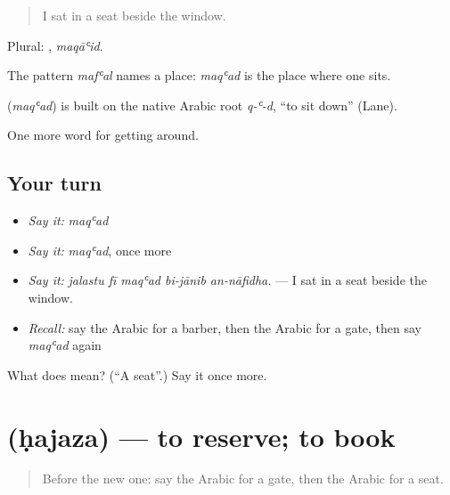 \begin{quote}
I sat in a seat beside the window.
\end{quote}

Plural: , \emph{maqāʿid}.

The pattern \emph{mafʿal} names a place: \emph{maqʿad} is the place where one sits.

\begin{cousinweb}
\textbf{} (\emph{maqʿad}) is built on the native Arabic root \emph{q-ʿ-d}, \textquotedblleft{}to sit down\textquotedblright{} (Lane).
\end{cousinweb}

\begin{grammarlens}[title={What you've built}]
One more word for getting around.
\end{grammarlens}

\subsection*{Your turn}
\begin{itemize}
\raggedright
  \item \emph{Say it:} \emph{maqʿad}
  \item \emph{Say it:} \emph{maqʿad}, once more
  \item \emph{Say it:} \emph{jalastu fī maqʿad bi-jānib an-nāfidha.} — I sat in a seat beside the window.
  \item \emph{Recall:} say the Arabic for a barber, then the Arabic for a gate, then say \emph{maqʿad} again
\end{itemize}

\begin{tcolorbox}[breakable,colback=teal!4,colframe=teal!35!black,title={Before you move on}]
What does  mean? (\textquotedblleft{}A seat\textquotedblright{}.) Say it once more.
\end{tcolorbox}
\section[\texorpdfstring{\ar{حجز} (ḥajaza)}{حجز (ḥajaza)}]{ (ḥajaza) — to reserve; to book}

\label{lesson:AR-C423-hajaza}



\begin{quote}
Before the new one: say the Arabic for a gate, then the Arabic for a seat.
\end{quote}

